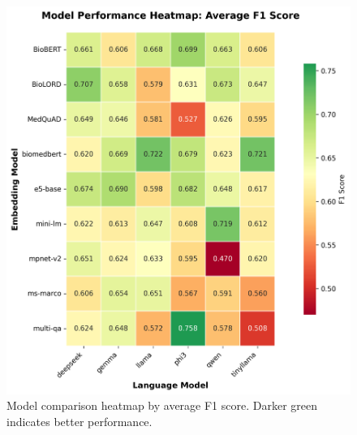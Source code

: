 \begin{figure}[!htbp]
  \centering
  \includegraphics[width=\textwidth]{chap4_results/images/heatmap_f1_score.png}
  \caption{Model comparison heatmap by average F1 score. Darker green indicates better performance.}
  \label{fig:heatmap_f1_score}
\end{figure}

